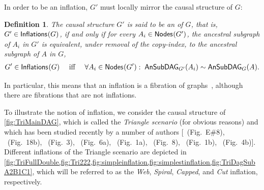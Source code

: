 \documentclass[aps,english,10pt,superscriptaddress,onecolumn,twoside,longbibliography,pra,floatfix,fleqn,nofootinbib]{revtex4-1}
\newcommand*{\tblue}[1]{{\color{MidnightBlue}{\textbf{#1}}}}
\newtheorem{definition}[theorem]{Definition}
\theoremstyle{definition}
\newcommand{\SmallNamedFunction}[3][]{\operatorname{\mathsf{#2}}_{#1}\parenths{#3}}
\newcommand{\ansubgraph}[2][]{\SmallNamedFunction[#1]{AnSubDAG}{#2}}
\newcommand{\nodes}[1]{\SmallNamedFunction{Nodes}{#1}}
\newcommand{\inflations}[1]{\SmallNamedFunction{Inflations}{#1}}
\DeclarePairedDelimiter{\parenths}{\lparen}{\rparen}
\begin{document}
In order to be an inflation, $G'$ must locally mirror the causal structure of $G$:
\begin{definition}
	The causal structure $G'$ is said to be an \tblue{inflation} of $G$, that is, $G' \in \inflations{G}$, if and only if for every $A_i\in\nodes{G'}$, the ancestral subgraph of $A_i$ in $G'$ is equivalent, under removal of the copy-index, to the ancestral subgraph of $A$ in $G$,
\begin{align}\label{eq:definflationDAG}
G' \in\inflations{G} \quad\text{ iff }\quad \forall A_i\in \nodes{G'}:\; \ansubgraph[G']{A_i}\sim\ansubgraph[G]{A}.
\end{align}
\end{definition}

In particular, this means that an inflation is a fibration of graphs~\cite{fibgraphs}, although there are fibrations that are not inflations.

To illustrate the notion of inflation, we consider the causal structure of \cref{fig:TriMainDAG}, which is called the {\em Triangle scenario} (for obvious reasons) and which has been studied recently by a number of authors [\citealp{pusey2014gdag}~(Fig.~E\#8), \citealp{WoodSpekkens}~(Fig.~18b), \citealp{fritz2012bell}~(Fig.~3), \citealp{chaves2014novel}~(Fig.~6a), \citealp{Chaves2015infoquantum}~(Fig.~1a), \citealp{BilocalCorrelations}~(Fig.~8), \citealp{steudel2010ancestors}~(Fig.~1b), \citealp{chaves2014informationinference}~(Fig.~4b)].
Different inflations of the Triangle scenario are depicted in \cref{fig:TriFullDouble,fig:Tri222,fig:simpleinflation,fig:simplestinflation,fig:TriDagSubA2B1C1}, which will be referred to as the {\em Web}, {\em Spiral}, {\em Capped}, and {\em Cut} inflation, respectively.
\end{document}

